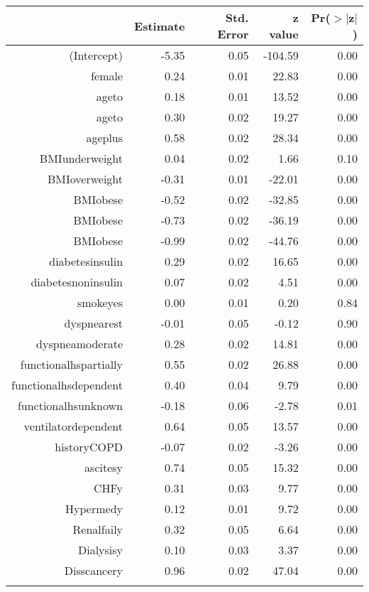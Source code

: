 \bigskip\bigskip
\centering
\begin{tabular}{rrrrr}
  \hline
 & Estimate & Std. Error & z value & Pr($>$$|$z$|$) \\ 
  \hline
(Intercept) & -5.35 & 0.05 & -104.59 & 0.00 \\ 
  female & 0.24 & 0.01 & 22.83 & 0.00 \\ 
  age\-65\-to\-74 & 0.18 & 0.01 & 13.52 & 0.00 \\ 
  age\-75\-to\-84 & 0.30 & 0.02 & 19.27 & 0.00 \\ 
  age\-85\-plus & 0.58 & 0.02 & 28.34 & 0.00 \\ 
  BMI\-underweight & 0.04 & 0.02 & 1.66 & 0.10 \\ 
  BMI\-overweight & -0.31 & 0.01 & -22.01 & 0.00 \\ 
  BMI\-obese\-1 & -0.52 & 0.02 & -32.85 & 0.00 \\ 
  BMI\-obese\-2 & -0.73 & 0.02 & -36.19 & 0.00 \\ 
  BMI\-obese\-3 & -0.99 & 0.02 & -44.76 & 0.00 \\ 
  diabetes\-insulin & 0.29 & 0.02 & 16.65 & 0.00 \\ 
  diabetes\-noninsulin & 0.07 & 0.02 & 4.51 & 0.00 \\ 
  smoke\-yes & 0.00 & 0.01 & 0.20 & 0.84 \\ 
  dyspnea\-rest & -0.01 & 0.05 & -0.12 & 0.90 \\ 
  dyspnea\-moderate & 0.28 & 0.02 & 14.81 & 0.00 \\ 
  functional\-hs\-partially & 0.55 & 0.02 & 26.88 & 0.00 \\ 
  functional\-hs\-dependent & 0.40 & 0.04 & 9.79 & 0.00 \\ 
  functional\-hs\-unknown & -0.18 & 0.06 & -2.78 & 0.01 \\ 
  ventilator\-dependent & 0.64 & 0.05 & 13.57 & 0.00 \\ 
  history\-COPD & -0.07 & 0.02 & -3.26 & 0.00 \\ 
  ascites\-y & 0.74 & 0.05 & 15.32 & 0.00 \\ 
  CHF\-y & 0.31 & 0.03 & 9.77 & 0.00 \\ 
  Hyper\-med\-y & 0.12 & 0.01 & 9.72 & 0.00 \\ 
  Renal\-fail\-y & 0.32 & 0.05 & 6.64 & 0.00 \\ 
  Dialysis\-y & 0.10 & 0.03 & 3.37 & 0.00 \\ 
  Diss\-cancer\-y & 0.96 & 0.02 & 47.04 & 0.00 \\ 
$$
\end{tabular}
